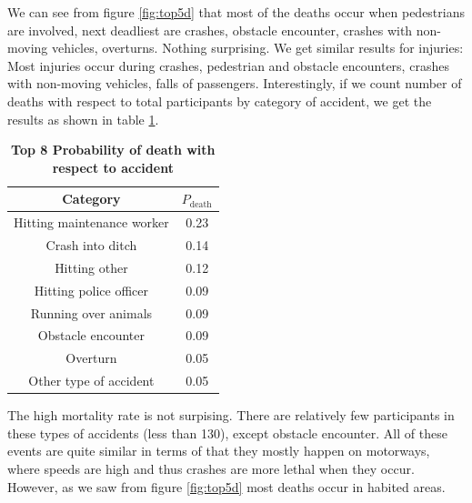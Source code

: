 We can see from figure \ref{fig:top5d} that most of the deaths occur when pedestrians are involved, next deadliest are crashes, obstacle encounter,
crashes with non-moving vehicles, overturns. Nothing surprising. We get similar results for injuries:
\noindent
 Most injuries occur during crashes, pedestrian and obstacle encounters, crashes with non-moving vehicles,
falls of passengers.
Interestingly, if we count number of deaths with respect to total participants by category of accident, we get the results 
as shown in table \ref{tab:prob_death}.
\begin{table}[h]
	\centering
	\label{tab:prob_death}
	\begin{tabular}{|c|c|}
		\hline
		Category & $P_{\text{death}}$ \\
		\hline
		Hitting maintenance worker & 0.23 \\
		\hline
		Crash into ditch & 0.14 \\
		\hline
		Hitting other & 0.12 \\
		\hline
		Hitting police officer & 0.09 \\
		\hline
		Running over animals & 0.09 \\ 
		\hline
		Obstacle encounter & 0.09 \\
		\hline
		Overturn & 0.05 \\
		\hline
		Other type of accident & 0.05 \\
		\hline
	\end{tabular}
	\caption{\textbf{Top 8 Probability of death with respect to accident}}
\end{table}
\noindent
The high mortality rate is not surpising. There are relatively few participants in these types of accidents (less than 130), except obstacle encounter.
All of these events are quite similar in terms of that they mostly happen on motorways, where speeds are high and thus crashes are more lethal when
they occur. However, as we saw from figure \ref{fig:top5d} most deaths occur in habited areas. \\
